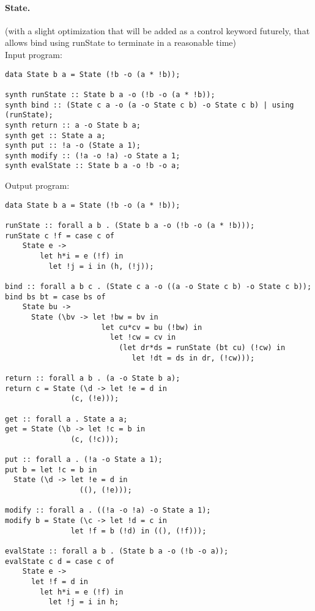 \documentclass{llncs}
\newcommand{\mypara}[1]{\paragraph{\textbf{#1}.}}
\begin{document}
\mypara{State} (with a slight optimization that will be added as a control keyword
futurely, that allows bind using runState to terminate in a reasonable time)
\\
Input program:
\begin{verbatim}
data State b a = State (!b -o (a * !b));

synth runState :: State b a -o (!b -o (a * !b));
synth bind :: (State c a -o (a -o State c b) -o State c b) | using (runState);
synth return :: a -o State b a;
synth get :: State a a;
synth put :: !a -o (State a 1);
synth modify :: (!a -o !a) -o State a 1;
synth evalState :: State b a -o !b -o a;
\end{verbatim}
Output program:
\begin{verbatim}
data State b a = State (!b -o (a * !b));

runState :: forall a b . (State b a -o (!b -o (a * !b)));
runState c !f = case c of
    State e ->
        let h*i = e (!f) in
          let !j = i in (h, (!j));

bind :: forall a b c . (State c a -o ((a -o State c b) -o State c b));
bind bs bt = case bs of
    State bu ->
      State (\bv -> let !bw = bv in
                      let cu*cv = bu (!bw) in
                        let !cw = cv in
                          (let dr*ds = runState (bt cu) (!cw) in
                             let !dt = ds in dr, (!cw)));

return :: forall a b . (a -o State b a);
return c = State (\d -> let !e = d in
               (c, (!e)));

get :: forall a . State a a;
get = State (\b -> let !c = b in
               (c, (!c)));

put :: forall a . (!a -o State a 1);
put b = let !c = b in
  State (\d -> let !e = d in
                 ((), (!e)));

modify :: forall a . ((!a -o !a) -o State a 1);
modify b = State (\c -> let !d = c in
               let !f = b (!d) in ((), (!f)));

evalState :: forall a b . (State b a -o (!b -o a));
evalState c d = case c of
    State e ->
      let !f = d in
        let h*i = e (!f) in
          let !j = i in h;
\end{verbatim}
\end{document}
